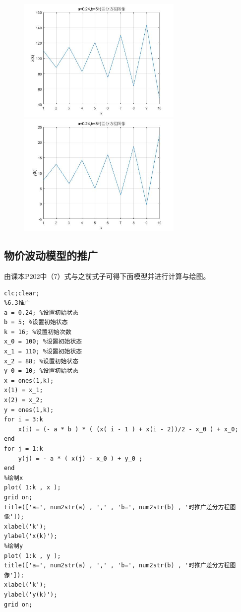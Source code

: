 \documentclass{ctexart}
\begin{document}
\begin{figure}[htbp]
\centering
\begin{minipage}[t]{0.48\textwidth}
\centering
\includegraphics[width=8cm]{6.1x.jpg}
\end{minipage}
\begin{minipage}[t]{0.48\textwidth}
\centering
\includegraphics[width=8cm]{6.1y.jpg}
\end{minipage}
\end{figure}

\subsection{物价波动模型的推广}
由课本P202中（7）式与之前式子可得下面模型并进行计算与绘图。
\begin{lstlisting}
clc;clear;
%6.3推广
a = 0.24; %设置初始状态
b = 5; %设置初始状态
k = 16; %设置初始次数
x_0 = 100; %设置初始状态
x_1 = 110; %设置初始状态
x_2 = 88; %设置初始状态
y_0 = 10; %设置初始状态
x = ones(1,k);
x(1) = x_1;
x(2) = x_2;
y = ones(1,k);
for i = 3:k
    x(i) = (- a * b ) * ( (x( i - 1 ) + x(i - 2))/2 - x_0 ) + x_0;
end
for j = 1:k
    y(j) = - a * ( x(j) - x_0 ) + y_0 ;
end
%绘制x
plot( 1:k , x );
grid on;
title(['a=', num2str(a) , ',' , 'b=', num2str(b) , '时推广差分方程图像']);
xlabel('k');
ylabel('x(k)');
%绘制y
plot( 1:k , y );
title(['a=', num2str(a) , ',' , 'b=', num2str(b) , '时推广差分方程图像']);
xlabel('k');
ylabel('y(k)');
grid on;
\end{lstlisting}
\end{document}
